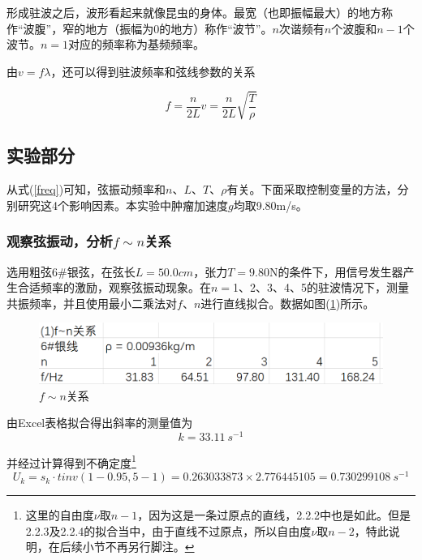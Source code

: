 \documentclass[a4paper,11pt]{article}
\begin{document}
            形成驻波之后，波形看起来就像昆虫的身体。最宽（也即振幅最大）的地方称作“波腹”，窄的地方（振幅为0的地方）称作“波节”。$n$次谐频有$n$个波腹和$n-1$个波节。$n=1$对应的频率称为基频频率。

            由$v=f\lambda$，还可以得到驻波频率和弦线参数的关系

            \begin{equation}
                f = \dfrac{n}{2L} v = \dfrac{n}{2L}\sqrt{\dfrac{T}{\rho}}
                \label{freq}
            \end{equation}

        \subsection{实验部分}

            从式(\ref{freq})可知，弦振动频率和$n$、$L$、$T$、$\rho$有关。下面采取控制变量的方法，分别研究这4个影响因素。本实验中肿瘤加速度$g$均取9.80m/s。

            \subsubsection{观察弦振动，分析$f\sim n$关系}

                选用粗弦6\#银弦，在弦长$L=50.0cm$，张力$T=9.80$N的条件下，用信号发生器产生合适频率的激励，观察弦振动现象。在$n=$1、2、3、4、5的驻波情况下，测量共振频率，并且使用最小二乘法对$f$、$n$进行直线拟合。数据如图(\ref{data1})所示。

                \begin{figure}[ht]
                    \centering
                    \includegraphics[scale=0.7]{1.f~n关系.png}
                    \caption{$f\sim n$关系}
                    \label{data1}
                \end{figure}

                由Excel表格拟合得出斜率的测量值为$$k=33.11~s^{-1}$$

                并经过计算得到不确定度\footnote{这里的自由度$\nu$取$n-1$，因为这是一条过原点的直线，2.2.2中也是如此。但是2.2.3及2.2.4的拟合当中，由于直线不过原点，所以自由度$\nu$取$n-2$，特此说明，在后续小节不再另行脚注。}$$U_k = s_k \cdot tinv(1-0.95, 5-1) = 0.263033873 \times 2.776445105
                = 0.730299108~s^{-1}$$
\end{document}
